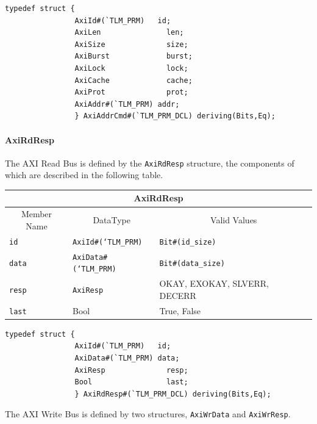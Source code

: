 \documentclass[twoside,letterpaper]{article}
\newcommand{\te}[1]{\texttt{#1}}
\begin{document}
\begin{verbatim}
typedef struct {
                AxiId#(`TLM_PRM)   id;
                AxiLen               len;   
                AxiSize              size;
                AxiBurst             burst;   
                AxiLock              lock;   
                AxiCache             cache;   
                AxiProt              prot;   
                AxiAddr#(`TLM_PRM) addr;
                } AxiAddrCmd#(`TLM_PRM_DCL) deriving(Bits,Eq);
\end{verbatim}

\paragraph{\bf AxiRdResp} The AXI Read Bus is defined by the \te{AxiRdResp} structure, the
                components of which are described in the following
                table. 


\begin{center}
\begin{tabular}{|p{1 in}|p{1.8in}|p{3.2 in}|}
\hline
\multicolumn{3}{|c|}{AxiRdResp} \\
\hline
\multicolumn{1}{|c|}{Member Name}&\multicolumn{1}{|c|}{DataType}&\multicolumn{1}{|c|}{Valid Values} \\
\hline
\hline
\te{id}&\te{AxiId\#(`TLM\_PRM)}&\te{Bit\#(id\_size)}\\
\hline
\te{data}&\te{AxiData\#(`TLM\_PRM)}&\te{Bit\#(data\_size)}\\
\hline
\te{resp}&\te{AxiResp}&OKAY, EXOKAY, SLVERR, DECERR\\
\hline
\te{last}&Bool&True, False\\
\hline
\end{tabular}
\end{center}

\begin{verbatim}
typedef struct {
                AxiId#(`TLM_PRM)   id;
                AxiData#(`TLM_PRM) data;
                AxiResp              resp;
                Bool                 last;
                } AxiRdResp#(`TLM_PRM_DCL) deriving(Bits,Eq);
\end{verbatim}


The AXI Write Bus is defined by  two structures, \te{AxiWrData} and
\te{AxiWrResp}.

\end{document}
